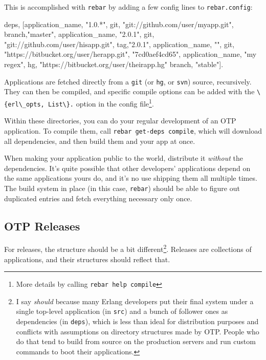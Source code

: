 \documentclass[11pt, oneside]{book}   	%
\newcommand{\filename}[1]{\Verb`#1`}
\newcommand{\app}[1]{\Verb`#1`}
\newcommand{\expression}[1]{\Verb`#1`}
\newcommand{\command}[1]{\Verb`#1`}
\begin{document}
This is accomplished with \app{rebar} by adding a few config lines to \filename{rebar.config}:

\begin{VerbatimText}
{deps,
 [{application_name, "1.0.*",
   {git, "git://github.com/user/myapp.git", {branch,"master"}}},
  {application_name, "2.0.1",
   {git, "git://github.com/user/hisapp.git", {tag,"2.0.1"}}},
  {application_name, "", 
   {git, "https://bitbucket.org/user/herapp.git",  "7cd0aef4cd65"}},
  {application_name, "my regex",
   {hg, "https://bitbucket.org/user/theirapp.hg" {branch, "stable"}}}]}.
\end{VerbatimText}

Applications are fetched directly from a \app{git} (or \app{hg}, or \app{svn}) source, recursively. They can then be compiled, and specific compile options can be added with the \expression{\{erl\_opts, List\}.} option in the config file\footnote{More details by calling \command{rebar help compile}}. 

Within these directories, you can do your regular development of an OTP application. To compile them, call \command{rebar get-deps compile}, which will download all dependencies, and then build them and your app at once.

When making your application public to the world, distribute it \emph{without} the dependencies. It's quite possible that other developers' applications depend on the same applications yours do, and it's no use shipping them all multiple times. The build system in place (in this case, \app{rebar}) should be able to figure out duplicated entries and fetch everything necessary only once.


\subsection{OTP Releases}
\label{subsec:building-otp-releases}

For releases, the structure should be a bit different\footnote{I say \emph{should} because many Erlang developers put their final system under a single top-level application (in \filename{src}) and a bunch of follower ones as dependencies (in \filename{deps}), which is less than ideal for distribution purposes and conflicts with assumptions on directory structures made by OTP. People who do that tend to build from source on the production servers and run custom commands to boot their applications.}. Releases are collections of applications, and their structures should reflect that.
\end{document}
